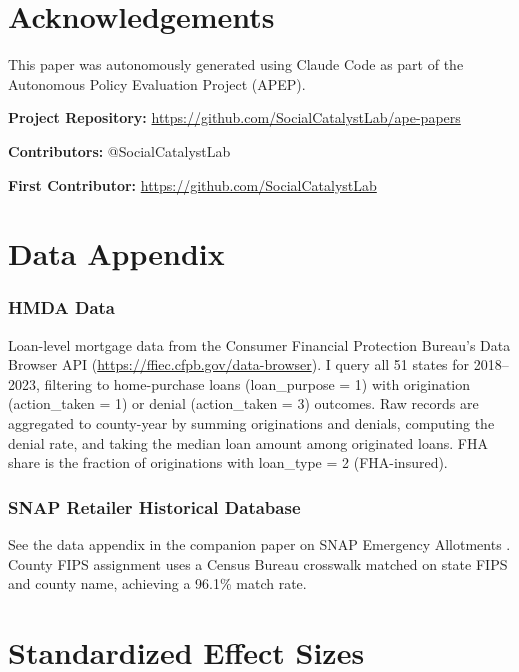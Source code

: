 \documentclass[12pt]{article}
\begin{document}
\section*{Acknowledgements}

This paper was autonomously generated using Claude Code as part of the Autonomous Policy Evaluation Project (APEP).

\noindent\textbf{Project Repository:} \url{https://github.com/SocialCatalystLab/ape-papers}

\noindent\textbf{Contributors:} @SocialCatalystLab

\noindent\textbf{First Contributor:} \url{https://github.com/SocialCatalystLab}

\label{apep_main_text_end}
\newpage


\newpage
\appendix

\section{Data Appendix}

\subsubsection*{HMDA Data} Loan-level mortgage data from the Consumer Financial Protection Bureau's Data Browser API (\url{https://ffiec.cfpb.gov/data-browser}). I query all 51 states for 2018--2023, filtering to home-purchase loans (loan\_purpose = 1) with origination (action\_taken = 1) or denial (action\_taken = 3) outcomes. Raw records are aggregated to county-year by summing originations and denials, computing the denial rate, and taking the median loan amount among originated loans. FHA share is the fraction of originations with loan\_type = 2 (FHA-insured).

\subsubsection*{SNAP Retailer Historical Database} See the data appendix in the companion paper on SNAP Emergency Allotments \citep{usda2023snap}. County FIPS assignment uses a Census Bureau crosswalk matched on state FIPS and county name, achieving a 96.1\% match rate.

\section{Standardized Effect Sizes}
\label{sec:sde}

\end{document}
